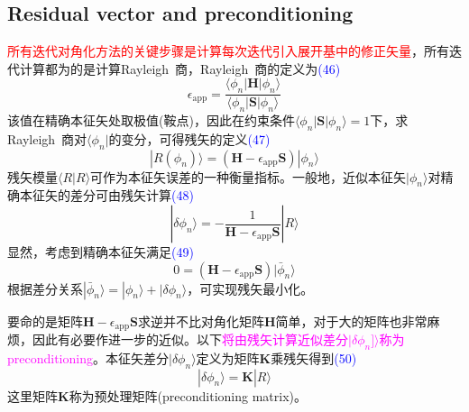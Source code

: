 \documentclass[14pt]{article}      %
\begin{document}
\subsection{Residual vector and preconditioning}
\textcolor{red}{所有迭代对角化方法的关键步骤是计算每次迭代引入展开基中的修正矢量}，所有迭代计算都为的是计算\textrm{Rayleigh~}商，\textrm{Rayleigh~}商的定义为\textcolor{blue}{(46)}
\begin{displaymath}
	\epsilon_{\mathrm{app}}=\dfrac{\langle\phi_n|\mathbf{H}|\phi_n\rangle}{\langle\phi_n|\mathbf{S}|\phi_n\rangle}
\end{displaymath}
该值在精确本征矢处取极值(鞍点)，因此在约束条件$\langle\phi_n|\mathbf{S}|\phi_n\rangle=1$下，求\textrm{Rayleigh~}商对$\langle\phi_n|$的变分，可得残矢的定义\textcolor{blue}{(47)}
\begin{displaymath}
	|R(\phi_n)\rangle=(\mathbf{H}-\epsilon_{\mathrm{app}}\mathbf{S})|\phi_n\rangle
\end{displaymath}
残矢模量$\langle R|R\rangle$可作为本征矢误差的一种衡量指标。一般地，近似本征矢$|\phi_n\rangle$对精确本征矢的差分可由残矢计算\textcolor{blue}{(48)}
\begin{displaymath}
	|\delta\phi_n\rangle=-\dfrac1{\mathbf{H}-\epsilon_{\mathrm{app}}\mathbf{S}}|R\rangle
\end{displaymath}
显然，考虑到精确本征矢满足\textcolor{blue}{(49)}
\begin{displaymath}
	0=(\mathbf{H}-\epsilon_{\mathrm{app}}\mathbf{S})|\bar{\phi}_n\rangle
\end{displaymath}
根据差分关系$|\bar{\phi}_n\rangle=|\phi_n\rangle+|\delta\phi_n\rangle$，可实现残矢最小化。

要命的是矩阵$\mathbf{H}-\epsilon_{\mathrm{app}}\mathbf{S}$求逆并不比对角化矩阵$\mathbf{H}$简单，对于大的矩阵也非常麻烦，因此有必要作进一步的近似。以下\textcolor{magenta}{将由残矢计算近似差分$|\delta\phi_n]\rangle$称为\textrm{preconditioning}}。本征矢差分$|\delta\phi_n\rangle$定义为矩阵$\mathbf{K}$乘残矢得到\textcolor{blue}{(50)}
\begin{displaymath}
	|\delta\phi_n\rangle=\mathbf{K}|R\rangle
\end{displaymath}
这里矩阵$\mathbf{K}$称为预处理矩阵(\textrm{preconditioning matrix})。
\end{document}
